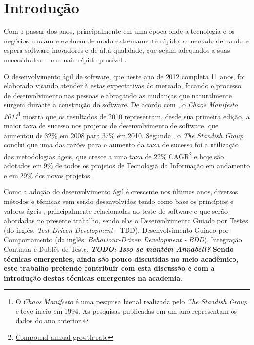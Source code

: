 \chapter{Introdução}

Com o passar dos anos, principalmente em uma época onde a tecnologia e os negócios mudam e evoluem de modo extremamente rápido, o mercado demanda e espera software inovadores e de alta qualidade, que sejam adequados a suas necessidades $-$ e o mais rápido possível \cite{TheBusinessOfInnovation}.

O desenvolvimento ágil de software, que neste ano de 2012 completa 11 anos, foi elaborado \cite{AgileManifesto} visando atender à estas expectativas do mercado, focando o processo de desenvolvimento nas pessoas e abraçando as mudanças que  naturalmente surgem durante a construção do software. De acordo com , o \textit{Chaos Manifesto 2011}\footnote{O \textit{Chaos Manifesto} é uma pesquisa bienal realizada pelo \textit{The Standish Group} e teve início em 1994. As pesquisas publicadas em um ano representam os dados do ano anterior.} mostra que os resultados de 2010 representam, desde sua primeira edição, a maior taxa de sucesso nos projetos de desenvolvimento de software, que aumentou de 32\% em 2008 para 37\% em 2010. Segundo , o \textit{The Standish Group} conclui que uma das razões para o aumento da taxa de sucesso foi a utilização das metodologias ágeis, que cresce a uma taxa de 22\% CAGR\footnote{\href{http://en.wikipedia.org/wiki/Compound_annual_growth_rate} {Compound annual growth rate}} e hoje são adotados em 9\% de todos os projetos de Tecnologia da Informação em andamento e em 29\% dos novos projetos.

Como a adoção do desenvolvimento ágil é crescente nos últimos anos, diversos métodos e técnicas vem sendo desenvolvidos tendo como base os princípios e valores ágeis \cite{BDDRodrigo}, principalmente relacionadas ao teste de software e que serão abordadas no presente trabalho, sendo elas o Desenvolvimento Guiado por Testes (do inglês, \textit{Test-Driven Development} - TDD), Desenvolvimento Guiado por Comportamento (do inglês, \textit{Behaviour-Driven Development - BDD}), Integração Contínua e Dublês de Teste. \textbf{\textit{TODO: Isso se mantém Annabell?} Sendo técnicas emergentes, ainda são pouco discutidas no meio acadêmico, este trabalho pretende contribuir com esta discussão e com a introdução destas técnicas emergentes na academia}.


